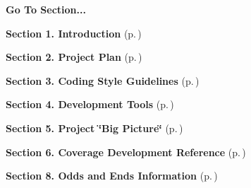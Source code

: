 \begin{Desc}
\item[{\bf Go To Section...}]\par
\begin{CompactItemize}
\item 
{\bf Section 1.  Introduction} {\rm (p.\,\pageref{page_intro})}\item 
{\bf Section 2.  Project Plan} {\rm (p.\,\pageref{page_project_plan})}\item 
{\bf Section 3.  Coding Style Guidelines} {\rm (p.\,\pageref{page_code_style})}\item 
{\bf Section 4.  Development Tools} {\rm (p.\,\pageref{page_tools})}\item 
{\bf Section 5.  Project \char`\"{}Big Picture\char`\"{}} {\rm (p.\,\pageref{page_big_picture})}\item 
{\bf Section 6.  Coverage Development Reference} {\rm (p.\,\pageref{page_code_details})}\item 
{\bf Section 8.  Odds and Ends Information} {\rm (p.\,\pageref{page_misc})}\end{CompactItemize}
\end{Desc}
